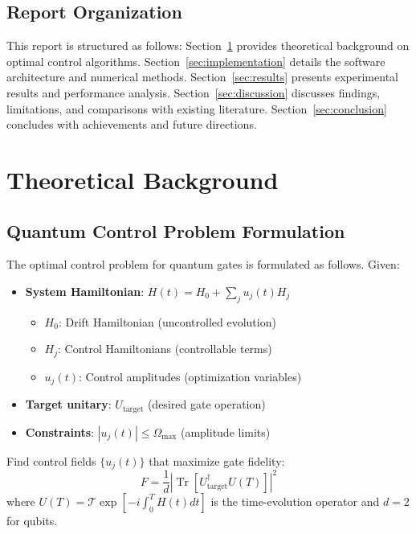 \documentclass[11pt,a4paper]{article}
\theoremstyle{definition}
\theoremstyle{remark}
\renewcommand{\Tr}{\operatorname{Tr}}
\begin{document}
\subsection{Report Organization}

This report is structured as follows: Section~\ref{sec:theory} provides theoretical background on optimal control algorithms. Section~\ref{sec:implementation} details the software architecture and numerical methods. Section~\ref{sec:results} presents experimental results and performance analysis. Section~\ref{sec:discussion} discusses findings, limitations, and comparisons with existing literature. Section~\ref{sec:conclusion} concludes with achievements and future directions.

\section{Theoretical Background}
\label{sec:theory}

\subsection{Quantum Control Problem Formulation}

The optimal control problem for quantum gates is formulated as follows. Given:

\begin{itemize}
    \item \textbf{System Hamiltonian}: $H(t) = H_0 + \sum_j u_j(t) H_j$
    \begin{itemize}
        \item $H_0$: Drift Hamiltonian (uncontrolled evolution)
        \item $H_j$: Control Hamiltonians (controllable terms)
        \item $u_j(t)$: Control amplitudes (optimization variables)
    \end{itemize}
    \item \textbf{Target unitary}: $U_{\text{target}}$ (desired gate operation)
    \item \textbf{Constraints}: $|u_j(t)| \leq \Omega_{\max}$ (amplitude limits)
\end{itemize}

Find control fields $\{u_j(t)\}$ that maximize gate fidelity:
\begin{equation}
F = \frac{1}{d}\left|\Tr\left[U_{\text{target}}^\dagger U(T)\right]\right|^2
\end{equation}
where $U(T) = \mathcal{T}\exp\left[-i\int_0^T H(t)dt\right]$ is the time-evolution operator and $d=2$ for qubits.
\end{document}
